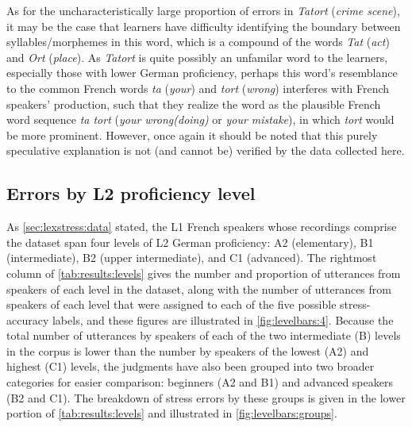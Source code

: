 			As for the uncharacteristically large proportion of errors in \textit{Tatort} (\textit{crime scene}), it may be the case that learners have difficulty identifying the boundary between syllables/morphemes in this word, which is a compound of the words \textit{Tat} (\textit{act}) and \textit{Ort} (\textit{place}).
			As \textit{Tatort} is quite possibly an unfamilar word to the learners, especially those with lower German proficiency, perhaps 
			this word's resemblance to the common French words \textit{ta} (\textit{your}) and \textit{tort} (\textit{wrong}) interferes with French speakers' production, such that they realize the word as the plausible French word sequence \textit{ta tort} (\textit{your wrong(doing)} or \textit{your mistake}), in which \textit{tort} would be more prominent.  
			However, once again it should be noted that this
			purely speculative explanation is not (and cannot be) verified by the data collected here.  
			
			
			
		
		
		
		\subsection{Errors by L2 proficiency level}
		\label{sec:results:level}
		
		
		
			
			As \cref{sec:lexstress:data} stated, the L1 French speakers whose recordings comprise the dataset span four levels of L2 German proficiency: A2 (elementary), B1 (intermediate), B2 (upper intermediate), and C1 (advanced). The rightmost column of \cref{tab:results:levels} gives the number and proportion of utterances from speakers of each level in the dataset, along with the number of utterances from speakers of each level that were assigned to each of the five possible stress-accuracy labels, and these figures are illustrated in \cref{fig:levelbars:4}. Because the total number of utterances by speakers of each of the two intermediate (B) levels in the corpus is lower than the number by speakers of the lowest (A2) and highest (C1) levels, the judgments have also been grouped into two broader categories for easier comparison: beginners (A2 and B1) and advanced speakers (B2 and C1). The breakdown of stress errors by these groups is given in the lower portion of \cref{tab:results:levels} and illustrated in \cref{fig:levelbars:groups}.
			
